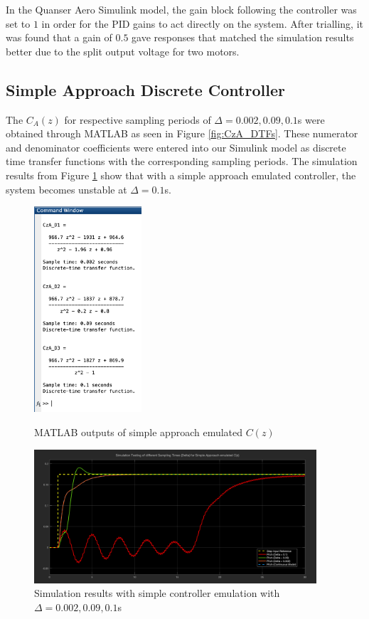 \documentclass[11pt]{article}
\begin{document}
In the Quanser Aero Simulink model, the gain block following the controller was set to $1$ in order for the PID gains to act directly on the system. After trialling, it was found that a gain of $0.5$ gave responses that matched the simulation results better due to the split output voltage for two motors. %

\subsection{Simple Approach Discrete Controller}
The $C_A(z)$ for respective sampling periods of $\Delta = 0.002, 0.09, 0.1$s were obtained through MATLAB as seen in Figure \ref{fig:CzA_DTFs}. These numerator and denominator coefficients were entered into our Simulink model as discrete time transfer functions with the corresponding sampling periods. The simulation results from Figure \ref{fig:CzA_DSim} show that with a simple approach emulated controller, the system becomes unstable at $\Delta = 0.1$s.

\begin{figure}[H]
\begin{minipage}{.3\textwidth}
    \centering
    \includegraphics[width=4cm]{W3_CzA_DTFs.png}
    \caption{MATLAB outputs of simple approach emulated $C(z)$}
    \label{fig:CzA_DTFs}
\end{minipage}
\hspace{1cm}
\begin{minipage}{.6\textwidth}
    \centering
    \includegraphics[width=10.5cm]{W3_CzA_DSim.png}
    \caption{Simulation results with simple controller emulation with $\Delta = 0.002, 0.09, 0.1$s}
    \label{fig:CzA_DSim}
\end{minipage}
\end{figure}
\end{document}
